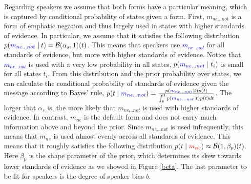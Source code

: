 \documentclass[linguex]{sp}
\theoremstyle{definition} \newtheorem{definition}{Definition}
\begin{document}
Regarding speakers we assume that both forms have a particular meaning, which is captured by conditional probability of states given a form. First, \textit{\color{blue} $m_{ne...not}$} is a form of emphatic negation and thus largely used in states with higher standards of evidence. In particular, we assume that it satisfies the following distribution $p(\textcolor{blue}{m_{ne...not}} \mid t ) = \mathcal{B}(\alpha_{s}, 1)(t)$.  This means that speakers use \textcolor{blue}{$m_{ne...not}$} for all standards of evidence, but more with higher standards of evidence. Notice that \textcolor{blue}{$m_{ne...not}$} is used with a very low probability in all states, $p(\textcolor{blue}{m_{ne...not}} \mid t_i)$ is small for all states $t_i$. From this distribution and the prior probability over states, we can calculate the conditional probability of standards of evidence given the message according to Bayes' rule, $p(t \mid \textcolor{blue}{m_{ne...not}}) = \frac{p(\textcolor{blue}{m_{ne...not}} \mid t ) p(t)}{\int_0^1 p(\textcolor{blue}{m_{ne...not}} \mid t ) p(t)dt}$. The larger that $\alpha_{s}$ is, the more likely that \textit{\color{blue} $m_{ne...not}$} is used with higher standards of evidence.  In contrast, \textit{\color{red} $m_{ne}$} is the default form and does not carry much information above and beyond the prior. Since \textit{\color{blue} $m_{ne...not}$} is used infrequently, this means that \textit{\color{red} $m_{ne}$} is used almost evenly across all standards of evidence. This means that it roughly satisfies the following distribution $p(t \mid \textit{\color{red} $m_{ne}$}) \approx \mathcal B (1, \beta_p)(t)$. Here $\beta_p$ is the shape parameter of the prior, which determines its skew towards lower standards of evidence as we showed in Figure \ref{beta}. The last parameter to be fit for speakers is the degree of speaker bias $b$.
\end{document}
